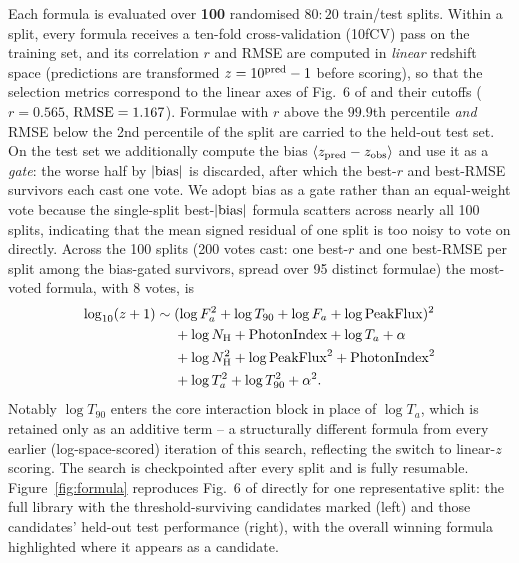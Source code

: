 \documentclass{aa}
\newcommand{\Fa}{F_a}
\newcommand{\Ta}{T_a}
\newcommand{\NH}{N_{\rm H}}
\newcommand{\logz}{\log_{10}(z+1)}
\begin{document}
Each formula is evaluated over \textbf{100} randomised $80{:}20$ train/test splits.
Within a split, every formula receives a ten-fold cross-validation (10fCV) pass on
the training set, and its correlation $r$ and RMSE are computed in \emph{linear}
redshift space (predictions are transformed $z = 10^{\rm pred}-1$ before scoring), so
that the selection metrics correspond to the linear axes of Fig.~6 of
\citet{narendra2025} and their cutoffs ($r=0.565$, ${\rm RMSE}=1.167$). Formulae with
$r$ above the $99.9$th percentile \emph{and} RMSE below the 2nd percentile of the
split are carried to the held-out test set. On the test set we additionally compute
the bias $\langle z_{\rm pred}-z_{\rm obs}\rangle$ and use it as a \emph{gate}: the
worse half by $|{\rm bias}|$ is discarded, after which the best-$r$ and best-RMSE
survivors each cast one vote. We adopt bias as a gate rather than an equal-weight
vote because the single-split best-$|{\rm bias}|$ formula scatters across nearly all
100 splits, indicating that the mean signed residual of one split is too noisy to
vote on directly. Across the 100 splits (200 votes cast: one best-$r$ and one best-RMSE per split
among the bias-gated survivors, spread over 95 distinct formulae) the most-voted
formula, with 8 votes, is
\begin{align}
  \logz \sim\; &(\log \Fa^2 + \log T_{90} + \log \Fa + \log{\rm PeakFlux})^2 \nonumber\\
       &+ \log \NH + {\rm PhotonIndex} + \log \Ta + \alpha \nonumber\\
       &+ \log \NH^2 + \log{\rm PeakFlux}^2 + {\rm PhotonIndex}^2 \nonumber\\
       &+ \log \Ta^2 + \log T_{90}^2 + \alpha^2 .
  \label{eq:winner}
\end{align}
Notably $\log T_{90}$ enters the core interaction block in place of $\log \Ta$,
which is retained only as an additive term -- a structurally different formula
from every earlier (log-space-scored) iteration of this search, reflecting the
switch to linear-$z$ scoring. The search is checkpointed after every split and is
fully resumable. Figure~\ref{fig:formula} reproduces Fig.~6 of
\citet{narendra2025} directly for one representative split: the full library with
the threshold-surviving candidates marked (left) and those candidates' held-out
test performance (right), with the overall winning formula highlighted where it
appears as a candidate.
\end{document}
